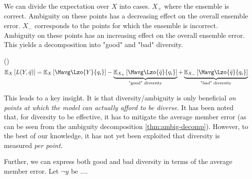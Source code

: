 \documentclass[../main.tex]{subfiles}
\begin{document}
We can divide the expectation over $X$ into cases.  $X_{+}$ where the ensemble is correct. Ambiguity on these points has a decreasing effect on the overall ensemble error. $X_{-}$ corresponds to the points for which the ensemble is incorrect. Ambiguity on these points has an increasing effect on the overall ensemble error. This yields a decomposition into "good" and "bad" diversity.

\begin{widepar}
\begin{theorem} (\cite{kuncheva})
$$
\mathbb{E}_{X}\left[   
L(Y, \bar{q}) 
\right]
=
\mathbb{E}_{X}\left[    \Mavg \Lzo{Y}{q_{i}}  \right]
- 
\underbrace{
\mathbb{E}_{X_{+}}\left[ \Mavg \Lzo{\bar{q}}{q_{i}} \right]  
}_{\text{"good" diversity}}
+ 
\underbrace{
\mathbb{E}_{X_{-}}\left[ \Mavg \Lzo{\bar{q}}{q_{i}} \right] 
}_{\text{"bad" diversity}}
$$
\end{theorem}
\end{widepar}

This leads to a key insight.
It is that diversity/ambiguity is only beneficial \textit{on points at which the model can actually afford to be diverse}. 
It has been noted that, for diversity to be effective, it has to mitigate the average member error \cite{todo} (as can be seen from the ambiguity decomposition \ref{thm:ambig-decomp}). However, to the best of our knowledge, it has not yet been exploited that diversity is measured \textit{per point}.

Further, we can express both good and bad diversity in terms of the average member error. Let $\neg y$ be ....

\end{document}
